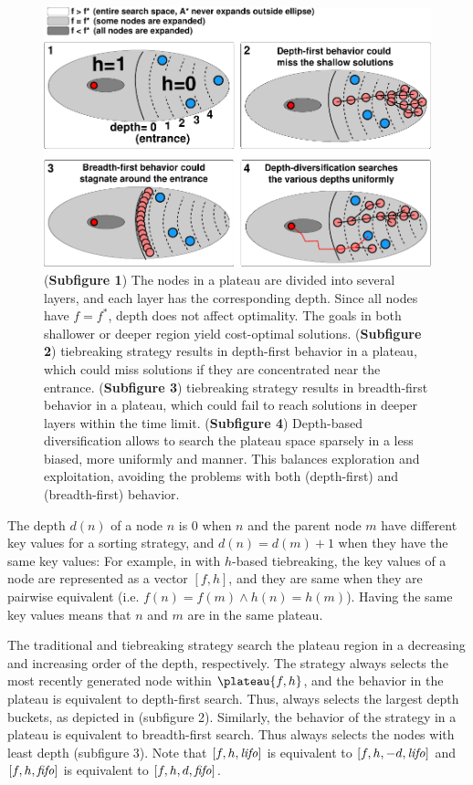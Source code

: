 \begin{figure}[htbp]
  \centering
  \includegraphics{img/astar/plateau-2.pdf}
 \caption{(\textbf{Subfigure 1}) The nodes in a plateau are divided into several layers, and each layer has the corresponding depth. Since all nodes have $f=f^*$, depth does not affect optimality. The goals in both shallower or deeper region yield cost-optimal solutions.
 (\textbf{Subfigure 2}) \lifo tiebreaking strategy results in depth-first behavior in a
 plateau, which could miss solutions if they are concentrated near the entrance.
 (\textbf{Subfigure 3}) \fifo tiebreaking strategy results in  breadth-first behavior in a
 plateau, which could fail to reach solutions in deeper layers within the time limit.
 (\textbf{Subfigure 4}) Depth-based diversification allows \astar to search the plateau space
 sparsely in a less biased, more uniformly and manner. This balances exploration and exploitation, avoiding the problems with both \lifo (depth-first) and \fifo (breadth-first) behavior.
 }
 \label{fig:plateau-depiction}
\end{figure}

The depth $d(n)$ of a
node $n$ is 0 when $n$ and the parent node $m$ have different key
values for a sorting strategy, and $d(n)=d(m)+1$ when they have the same
key values: For example, in \astar with $h$-based tiebreaking, the key
values of a node are represented as a vector $[f,h]$, and they are same
when they are pairwise equivalent (i.e. $f(n) = f(m) \land h(n) =
h(m)$).  Having the same key values means that $n$ and $m$ are in the
same plateau.

The traditional \lifo and \fifo tiebreaking strategy 
search the plateau region in a decreasing and increasing order of the depth, respectively.
The \lifo strategy always selects the most recently generated node
within $\plateau{f,h}$, and the behavior in the plateau is equivalent to depth-first search.
Thus, \lifo always selects the largest depth
buckets, as depicted in  (subfigure 2).
Similarly, the behavior of the \fifo strategy 
in a plateau is equivalent to breadth-first search. Thus \fifo 
always selects the nodes with least depth (subfigure 3).
Note that  $[f,h,{\text{\textit{lifo}}}]$ is equivalent to $[f,h,-d,{\text{\textit{lifo}}}]$ and
$[f,h,{\text{\textit{fifo}}}]$ is equivalent to $[f,h,d,{\text{\textit{fifo}}}]$.

